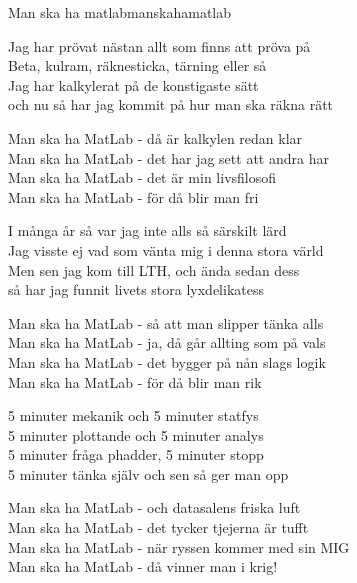 \begin{song}{Man ska ha matlab}{manskahamatlab}
    \av{}
    \begin{vers}
        Jag har prövat nästan allt som finns att pröva på\\
        Beta, kulram, räknesticka, tärning eller så\\
        Jag har kalkylerat på de konstigaste sätt\\
        och nu så har jag kommit på hur man ska räkna rätt\\
        \end{vers}
        \begin{vers}        
        Man ska ha MatLab - då är kalkylen redan klar\\
        Man ska ha MatLab - det har jag sett att andra har\\
        Man ska ha MatLab - det är min livsfilosofi\\
        Man ska ha MatLab - för då blir man fri\\
    \end{vers}
    \begin{vers}
        I många år så var jag inte alls så särskilt lärd\\
        Jag visste ej vad som vänta mig i denna stora värld\\
        Men sen jag kom till LTH, och ända sedan dess \\
        så har jag funnit livets stora lyxdelikatess\\
    \end{vers}
    \begin{vers}
        Man ska ha MatLab - så att man slipper tänka alls\\
        Man ska ha MatLab - ja, då går allting som på vals\\
        Man ska ha MatLab - det bygger på nån slags logik\\
        Man ska ha MatLab - för då blir man rik\\
    \end{vers}
    \begin{vers}
        5 minuter mekanik och 5 minuter statfys\\
        5 minuter plottande och 5 minuter analys\\
        5 minuter fråga phadder, 5 minuter stopp\\
        5 minuter tänka själv och sen så ger man opp\\
    \end{vers}
    \begin{vers}
        Man ska ha MatLab - och datasalens friska luft\\
        Man ska ha MatLab - det tycker tjejerna är tufft\\
        Man ska ha MatLab - när ryssen kommer med sin MIG\\
        Man ska ha MatLab - då vinner man i krig!\\
    \end{vers}
    \end{song}